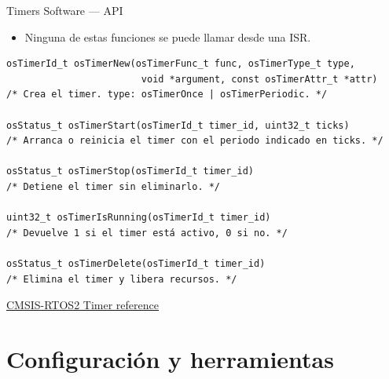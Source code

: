 \begin{frame}[fragile]{Timers Software — API}
    \begin{itemize}
        \item \alert{Ninguna de estas funciones se puede llamar
              desde una ISR.}
    \end{itemize}
    \begin{verbatim}
osTimerId_t osTimerNew(osTimerFunc_t func, osTimerType_t type,
                        void *argument, const osTimerAttr_t *attr)
/* Crea el timer. type: osTimerOnce | osTimerPeriodic. */

osStatus_t osTimerStart(osTimerId_t timer_id, uint32_t ticks)
/* Arranca o reinicia el timer con el periodo indicado en ticks. */

osStatus_t osTimerStop(osTimerId_t timer_id)
/* Detiene el timer sin eliminarlo. */

uint32_t osTimerIsRunning(osTimerId_t timer_id)
/* Devuelve 1 si el timer está activo, 0 si no. */

osStatus_t osTimerDelete(osTimerId_t timer_id)
/* Elimina el timer y libera recursos. */
    \end{verbatim}
    \vspace{4pt}
    \href{https://arm-software.github.io/CMSIS_5/RTOS2/html/group__CMSIS__RTOS__TimerMgmt.html}
    {CMSIS-RTOS2 Timer reference}
\end{frame}

\section[Configuración]{Configuración y herramientas}


